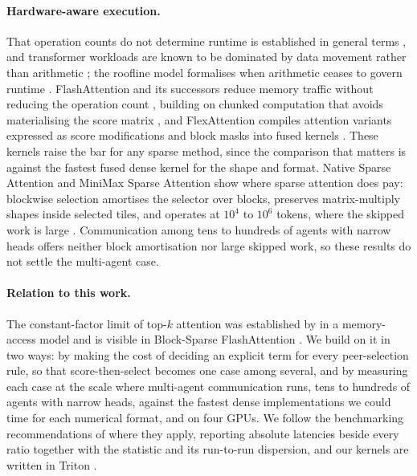 \paragraph{Hardware-aware execution.} That operation counts do not determine
runtime is established in general terms \citep{dehghani2022misnomer}, and
transformer workloads are known to be dominated by data movement rather than
arithmetic \citep{ivanov2021datamovement}; the roofline model formalises when
arithmetic ceases to govern runtime \citep{williams2009roofline}. FlashAttention
and its successors reduce memory traffic without reducing the operation count
\citep{dao2022flashattention,dao2024flashattention2,shah2024flashattention3},
building on chunked computation that avoids materialising the score matrix
\citep{rabe2021selfattention}, and FlexAttention compiles attention variants
expressed as score modifications and block masks into fused kernels
\citep{dong2025flexattention}. These kernels raise the bar for any sparse
method, since the comparison that matters is against the fastest fused dense
kernel for the shape and format. Native Sparse Attention and MiniMax Sparse
Attention show where sparse attention does pay: blockwise selection amortises
the selector over blocks, preserves matrix-multiply shapes inside selected
tiles, and operates at $10^4$ to $10^6$ tokens, where the skipped work is large
\citep{yuan2025nsa,lai2026msa}. Communication among tens to hundreds of agents
with narrow heads offers neither block amortisation nor large skipped work, so
these results do not settle the multi-agent case.

\paragraph{Relation to this work.} The constant-factor limit of top-$k$ attention
was established by \citet{chen2023dfss} in a memory-access model and is visible
in Block-Sparse FlashAttention \citep{ohayon2026bsfa}. We build on it in two
ways: by making the cost of deciding an explicit term for every peer-selection
rule, so that score-then-select becomes one case among several, and by
measuring each case at the scale where multi-agent communication runs, tens to
hundreds of agents with narrow heads, against the fastest dense implementations we
could time for each numerical format, and on four GPUs. We follow the benchmarking
recommendations of \citet{hoefler2015benchmarking} where they apply, reporting
absolute latencies beside every ratio together with the statistic and its
run-to-run dispersion, and our kernels are written in Triton
\citep{tillet2019triton}.
